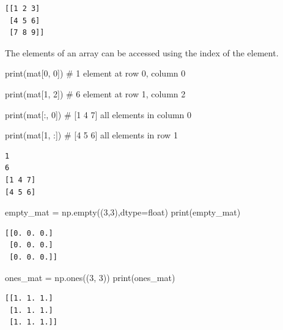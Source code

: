 \documentclass[
  letterpaper,
  DIV=11,
  numbers=noendperiod]{scrreprt}
\newenvironment{Shaded}{\begin{snugshade}}{\end{snugshade}}
\newcommand{\BuiltInTok}[1]{\textcolor[rgb]{0.00,0.23,0.31}{#1}}
\newcommand{\CommentTok}[1]{\textcolor[rgb]{0.37,0.37,0.37}{#1}}
\newcommand{\DecValTok}[1]{\textcolor[rgb]{0.68,0.00,0.00}{#1}}
\newcommand{\NormalTok}[1]{\textcolor[rgb]{0.00,0.23,0.31}{#1}}
\newcommand{\OperatorTok}[1]{\textcolor[rgb]{0.37,0.37,0.37}{#1}}
\begin{document}
\begin{verbatim}
[[1 2 3]
 [4 5 6]
 [7 8 9]]
\end{verbatim}

The elements of an array can be accessed using the index of the element.

\begin{Shaded}
\begin{Highlighting}[]
\BuiltInTok{print}\NormalTok{(mat[}\DecValTok{0}\NormalTok{, }\DecValTok{0}\NormalTok{])   }\CommentTok{\# 1 element at row 0, column 0}


\BuiltInTok{print}\NormalTok{(mat[}\DecValTok{1}\NormalTok{, }\DecValTok{2}\NormalTok{])  }\CommentTok{\# 6 element at row 1, column 2}


\BuiltInTok{print}\NormalTok{(mat[:, }\DecValTok{0}\NormalTok{])  }\CommentTok{\# [1 4 7] all elements in column 0}


\BuiltInTok{print}\NormalTok{(mat[}\DecValTok{1}\NormalTok{, :])  }\CommentTok{\# [4 5 6] all elements in row 1}
\end{Highlighting}
\end{Shaded}

\begin{verbatim}
1
6
[1 4 7]
[4 5 6]
\end{verbatim}

\begin{Shaded}
\begin{Highlighting}[]
\NormalTok{empty\_mat }\OperatorTok{=}\NormalTok{ np.empty((}\DecValTok{3}\NormalTok{,}\DecValTok{3}\NormalTok{),dtype}\OperatorTok{=}\BuiltInTok{float}\NormalTok{)}
\BuiltInTok{print}\NormalTok{(empty\_mat)}
\end{Highlighting}
\end{Shaded}

\begin{verbatim}
[[0. 0. 0.]
 [0. 0. 0.]
 [0. 0. 0.]]
\end{verbatim}

\begin{Shaded}
\begin{Highlighting}[]
\NormalTok{ones\_mat }\OperatorTok{=}\NormalTok{ np.ones((}\DecValTok{3}\NormalTok{, }\DecValTok{3}\NormalTok{))}
\BuiltInTok{print}\NormalTok{(ones\_mat)}
\end{Highlighting}
\end{Shaded}

\begin{verbatim}
[[1. 1. 1.]
 [1. 1. 1.]
 [1. 1. 1.]]
\end{verbatim}
\end{document}

